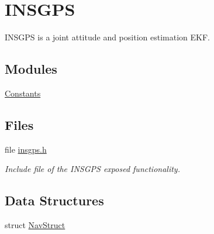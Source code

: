 \hypertarget{group___i_n_s_g_p_s}{\section{I\-N\-S\-G\-P\-S}
\label{group___i_n_s_g_p_s}
}


I\-N\-S\-G\-P\-S is a joint attitude and position estimation E\-K\-F.  


\subsection*{Modules}
\begin{DoxyCompactItemize}
\item 
\hyperlink{group___constants}{Constants}
\end{DoxyCompactItemize}
\subsection*{Files}
\begin{DoxyCompactItemize}
\item 
file \hyperlink{insgps_8h}{insgps.\-h}
\begin{DoxyCompactList}\small\item\em Include file of the I\-N\-S\-G\-P\-S exposed functionality. \end{DoxyCompactList}\end{DoxyCompactItemize}
\subsection*{Data Structures}
\begin{DoxyCompactItemize}
\item 
struct \hyperlink{struct_nav_struct}{Nav\-Struct}
\end{DoxyCompactItemize}
